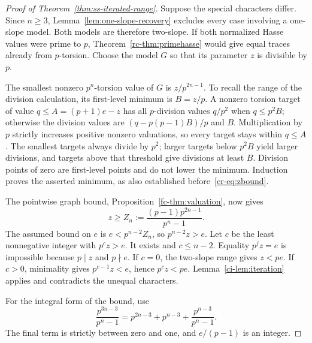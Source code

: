 \begin{proof}[Proof of Theorem~\ref{thm:ss-iterated-range}]
Suppose the special characters differ. Since $n\ge3$, Lemma~\ref{lem:one-slope-recovery} excludes every case involving a one-slope model. Both models are therefore two-slope. If both normalized Hasse values were prime to $p$, Theorem~\ref{rc-thm:primehasse} would give equal traces already from $p$-torsion. Choose the model $G$ so that its parameter $z$ is divisible by $p$.

The smallest nonzero $p^n$-torsion value of $G$ is $z/p^{2n-1}$. To recall the range of the division calculation, its first-level minimum is $B=z/p$. A nonzero torsion target of value $q\le A=(p+1)e-z$ has all $p$-division values $q/p^2$ when $q\le p^2B$; otherwise the division values are $(q-p(p-1)B)/p$ and $B$. Multiplication by $p$ strictly increases positive nonzero valuations, so every target stays within $q\le A$. The smallest targets always divide by $p^2$; larger targets below $p^2B$ yield larger divisions, and targets above that threshold give divisions at least $B$. Division points of zero are first-level points and do not lower the minimum. Induction proves the asserted minimum, as also established before~\eqref{cr-eq:zbound}.

The pointwise graph bound, Proposition~\ref{fc-thm:valuation}, now gives
\[
 z\ge Z_n:=\frac{(p-1)p^{2n-1}}{p^n-1}.
\]
The assumed bound on $e$ is $e<p^{n-2}Z_n$, so $p^{n-2}z>e$. Let $c$ be the least nonnegative integer with $p^cz>e$. It exists and $c\le n-2$. Equality $p^jz=e$ is impossible because $p\mid z$ and $p\nmid e$. If $c=0$, the two-slope range gives $z<pe$. If $c>0$, minimality gives $p^{c-1}z<e$, hence $p^cz<pe$. Lemma~\ref{ci-lem:iteration} applies and contradicts the unequal characters.

For the integral form of the bound, use
\[
 \frac{p^{3n-3}}{p^n-1}
 =p^{2n-3}+p^{n-3}+\frac{p^{n-3}}{p^n-1}.
\]
The final term is strictly between zero and one, and $e/(p-1)$ is an integer.
\end{proof}

